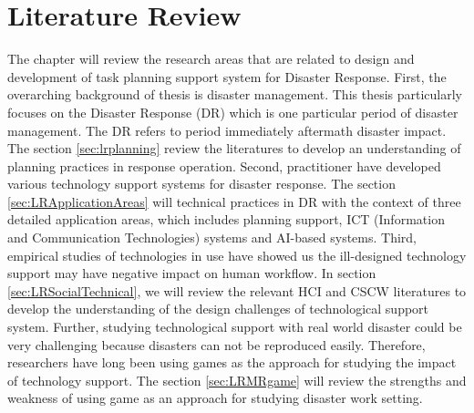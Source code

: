 \chapter{Literature Review}\label{ch:examples}
The chapter will review the research areas that are related to design and development of task planning support system for Disaster Response. First, the overarching background of thesis is disaster management. This thesis particularly focuses on the Disaster Response (DR) which is one particular period of disaster management. The DR refers to period immediately aftermath disaster impact. The section \ref{sec:lrplanning} review the literatures to develop an understanding of planning practices in response operation. Second, practitioner have developed various technology support systems for disaster response. The section \ref{sec:LRApplicationAreas} will technical practices in DR with the context of three detailed application areas, which includes planning support, ICT (Information and Communication Technologies) systems and AI-based systems. Third, empirical studies of technologies in use have showed us the ill-designed technology support may have negative impact on human workflow. In section \ref{sec:LRSocialTechnical}, we will review the relevant HCI and CSCW literatures to develop the understanding of the design challenges of technological support system.  Further, studying technological support with real world disaster could be very challenging because disasters can not be reproduced easily. Therefore, researchers have long been using games as the approach for studying the impact of technology support.  The section \ref{sec:LRMRgame} will review the strengths and weakness of using game as an approach for studying disaster work setting. \\


